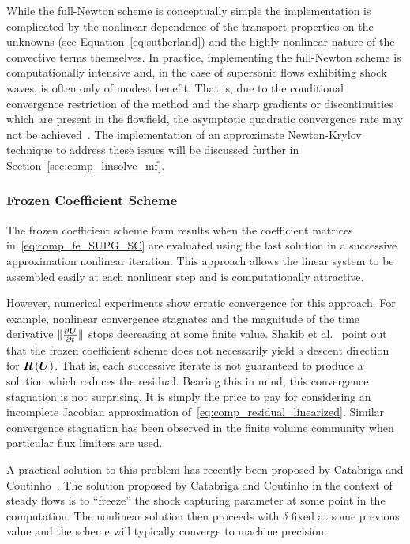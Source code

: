 While the full-Newton scheme is conceptually simple the implementation is complicated by the nonlinear dependence of the transport properties on the unknowns (see Equation~\eqref{eq:sutherland}) and the highly nonlinear nature of the convective terms themselves.  In practice, implementing the full-Newton scheme is computationally intensive and, in the case of supersonic flows exhibiting shock waves, is often only of modest benefit.  That is, due to the conditional convergence restriction of the method and the sharp gradients or discontinuities which are present in the flowfield, the asymptotic quadratic convergence rate may not be achieved~\cite{johan_hughes_shakib_mf}. The implementation of an approximate Newton-Krylov technique to address these issues will be discussed further in Section~\ref{sec:comp_linsolve_mf}.  

\subsubsection{Frozen Coefficient Scheme}
The frozen coefficient scheme form results when the coefficient matrices in~\eqref{eq:comp_fe_SUPG_SC} are evaluated using the last solution in a successive approximation nonlinear iteration.  This approach allows the linear system to be assembled easily at each nonlinear step and is computationally attractive.

However, numerical experiments show erratic convergence for this approach.  For example, nonlinear convergence stagnates and  the magnitude of the time derivative $\|{\frac{\partial{{\boldsymbol{U}}}}{\partial{t}}}\|$ stops decreasing at some finite value.  Shakib et al.~\cite{johan_hughes_shakib_mf} point out that the frozen coefficient scheme does not necessarily yield a descent direction for ${\boldsymbol{R}}\left({\boldsymbol{U}}\right)$.  That is, each successive iterate is not guaranteed to produce a solution which reduces the residual.  Bearing this in mind, this convergence stagnation is not surprising.  It is simply the price to pay for considering an incomplete Jacobian approximation of~\eqref{eq:comp_residual_linearized}. Similar convergence stagnation has been observed in the finite volume community when particular flux limiters are used.

A practical solution to this problem has recently been proposed by Catabriga and Coutinho~\cite{catabriga_coutinho_SUPG_convergence}.  The solution proposed by Catabriga and Coutinho in the context of steady flows is to ``freeze'' the shock capturing parameter at some point in the computation.  The nonlinear solution then proceeds with $\delta$ fixed at some previous value and the scheme will typically converge to machine precision.

